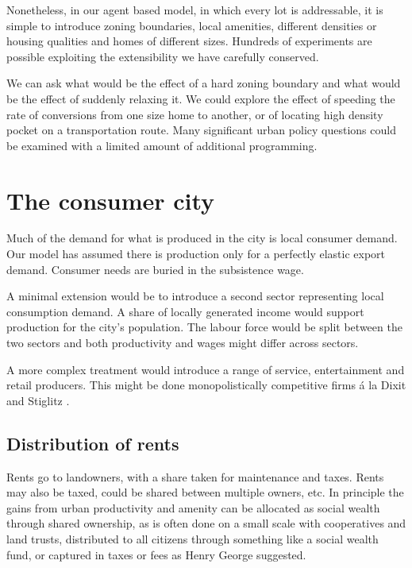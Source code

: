 Nonetheless, in our agent based model, in which every lot is  addressable, it is simple to introduce zoning boundaries, local amenities, different densities or housing qualities and homes of different sizes. Hundreds of experiments are possible exploiting  the extensibility we have carefully conserved.  

We can ask what would be the effect of a hard zoning boundary and what would be the effect of suddenly relaxing it. We could explore the effect of speeding the rate of conversions from one size  home to another, or of locating high density pocket on a transportation route. Many significant urban policy questions could be examined with a limited amount of additional programming. 

\section{The consumer city}
Much of the demand for what is produced in the city is local consumer demand.  Our model has assumed there is production only for a perfectly elastic export demand. Consumer needs are buried in the subsistence wage. 

A minimal extension would be to introduce a second sector representing local consumption demand. A share of locally generated income would support production for the city's population. The labour force would be split between the two sectors and both productivity and wages might differ across sectors. 

A more complex treatment would introduce a range of service, entertainment and retail producers. This might be done monopolistically competitive firms \'a la Dixit and Stiglitz \cite{AvinashK.Dixit1977MCaO}.



\subsection{Distribution of rents}
Rents go to landowners, with a share taken for maintenance and taxes.
Rents may also be taxed, could be shared between multiple owners, etc.
In principle the gains from urban productivity and amenity can be allocated as social wealth through shared ownership, as is often done on a small scale with cooperatives and land trusts, distributed to all citizens through something like a social wealth fund, or captured in taxes or fees as Henry George suggested. 





